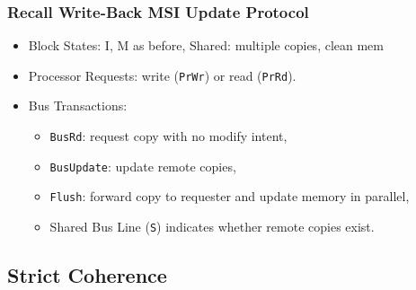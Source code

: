 \documentclass{beamer}
\newcommand{\emp}[1]{\textcolor{DikuRed}{ #1}}
\begin{document}
\begin{frame}[fragile,t]
\frametitle{Recall Write-Back MSI Update Protocol}

\begin{itemize}
    \item \emp{Block States}: I, M as before, Shared: multiple copies, clean mem

    \item \emp{Processor Requests}: write ({\tt PrWr}) or read ({\tt PrRd}).\smallskip

    \item \emp{Bus Transactions}:
        \begin{itemize}
            \item {\tt BusRd}: request copy with no modify intent,
            \item {\tt BusUpdate}: update remote copies,
            \item {\tt Flush}: forward copy to requester and update memory in parallel,
            \item \emp{Shared Bus Line ({\tt S}) indicates whether remote copies exist.}
        \end  {itemize}
\end{itemize}
\vspace{-3ex}


\end{frame}


\subsection{Strict Coherence}
\end{document}

